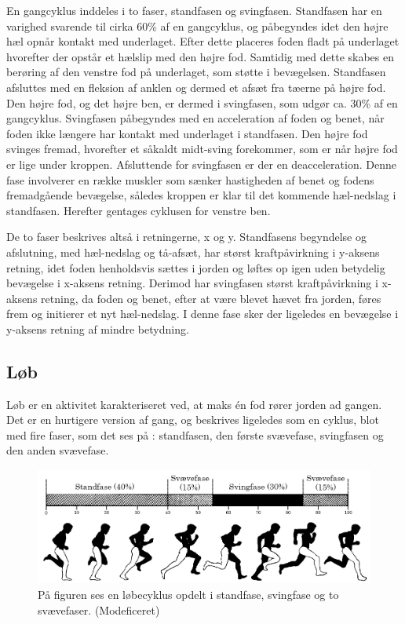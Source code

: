 En gangcyklus inddeles i to faser, standfasen og svingfasen.
Standfasen har en varighed svarende til cirka 60\% af en gangcyklus, og påbegyndes idet den højre hæl opnår kontakt med underlaget. Efter dette placeres foden fladt på underlaget hvorefter der opstår et hælslip med den højre fod. Samtidig med dette skabes en berøring af den venstre fod på underlaget, som støtte i bevægelsen. Standfasen afsluttes med en fleksion af anklen og dermed et afsæt fra tæerne på højre fod.\citep{VaughanDavisOConnor1992,Whittle1990}  \newline 
Den højre fod, og det højre ben, er dermed i svingfasen, som udgør ca. 30\% af en gangcyklus. Svingfasen påbegyndes med en acceleration af foden og benet, når foden ikke længere har kontakt med underlaget i standfasen. Den højre fod svinges fremad, hvorefter et såkaldt midt-sving forekommer, som er når højre fod er lige under kroppen. Afsluttende for svingfasen er der en deacceleration. Denne fase involverer en række muskler som sænker hastigheden af benet og fodens fremadgående bevægelse, således kroppen er klar til det kommende hæl-nedslag i standfasen. Herefter gentages cyklusen for venstre ben.\citep{VaughanDavisOConnor1992,Whittle1990}

De to faser beskrives altså i retningerne, x og y. Standfasens begyndelse og afslutning, med hæl-nedslag og tå-afsæt, har størst kraftpåvirkning i y-aksens retning, idet foden henholdsvis sættes i jorden og løftes op igen uden betydelig bevægelse i x-aksens retning. Derimod har svingfasen størst kraftpåvirkning i x-aksens retning, da foden og benet, efter at være blevet hævet fra jorden, føres frem og initierer et nyt hæl-nedslag. I denne fase sker der ligeledes en bevægelse i y-aksens retning af mindre betydning. \citep{Rueterbories2010} 


\subsection{Løb}
Løb er en aktivitet karakteriseret ved, at maks én fod rører jorden ad gangen. 
Det er en hurtigere version af gang, og beskrives ligeledes som en cyklus, blot med fire faser, som det ses på : standfasen, den første svævefase, svingfasen og den anden svævefase. \citep{Adelaar1986,Novacheck1998}

\begin{figure}[H]
	\centering
	\includegraphics[scale=0.4]{figures/bProblemloesning/loeb_cyklus1.png}
	\caption{På figuren ses en løbecyklus opdelt i standfase, svingfase og to svævefaser. \citep{Adelaar1986} (Modeficeret)}
	\label{fig:loebecyklus}
\end{figure}

